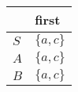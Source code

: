 \documentclass{standalone}
\providecommand\lightrule{%
	\arrayrulecolor{black!30}%
	\midrule[\lightrulewidth]%
	\arrayrulecolor{black}}
\begin{document}
\begin{tabularx}{\textwidth}{XX}
     & first \\
    \midrule
        \(S\)
        &
        \(\{a, c\}\)
        \\ \lightrule
        \(A\)
        &
        \(\{a, c\}\)
        \\ \lightrule
        \(B\)
        &
        \(\{a, c\}\)
\end{tabularx}
\end{document}
